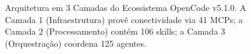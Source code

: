 \begin{figure}[H]
{%
}
\caption{Arquitetura em 3 Camadas do Ecossistema OpenCode v5.1.0. A Camada 1 (Infraestrutura) prov\^e conectividade via 41 MCPs; a Camada 2 (Processamento) cont\'em 106 skills; a Camada 3 (Orquestra\c{c}\~ao) coordena 125 agentes.}
\label{fig:arquitetura-3camadas}
\end{figure}
